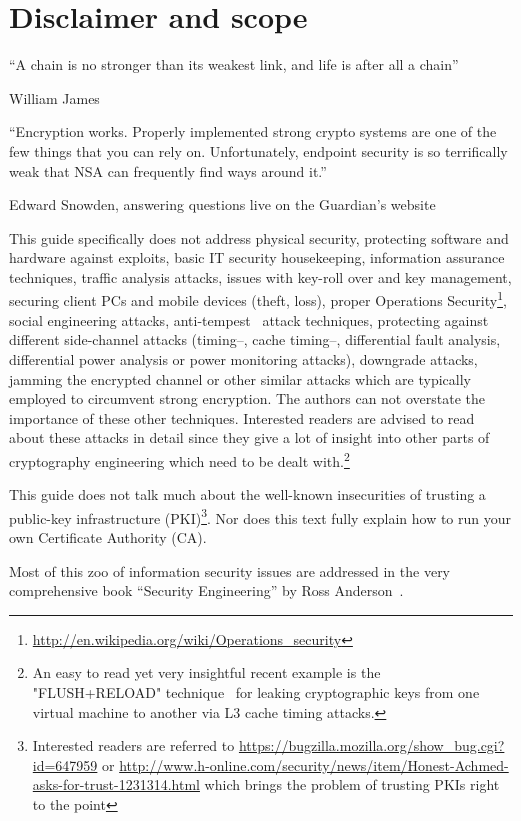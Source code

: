 \section{Disclaimer and scope}
\label{section:disclaimer}
\label{sec:disclaimer-scope}

\epigraph{``A chain is no stronger than its weakest link, and life is after all a chain''}{William James}
\epigraph{``Encryption works. Properly implemented strong crypto systems are
one of the few things that you can rely on. Unfortunately, endpoint security is
so terrifically weak that NSA can frequently find ways around it.''}{Edward
Snowden, answering questions live on the Guardian's
website~\cite{snowdenGuardianGreenwald}}


This guide specifically does not address physical security, protecting software
and hardware against exploits, basic IT security housekeeping, information
assurance techniques, traffic analysis attacks, issues with key-roll over and
key management, securing client PCs and mobile devices (theft, loss), proper
Operations Security\footnote{\url{http://en.wikipedia.org/wiki/Operations_security}}, social
engineering attacks, anti-tempest~\cite{Wikipedia:Tempest} attack techniques,
protecting against different side-channel attacks (timing--, cache timing--,
differential fault analysis, differential power analysis or power monitoring
attacks), downgrade attacks, jamming the encrypted channel or other similar
attacks which are typically employed to circumvent strong encryption.  The
authors can not overstate the importance of these other techniques.  Interested
readers are advised to read about these attacks in detail since they give a lot
of insight into other parts of cryptography engineering which need to be dealt
with.\footnote{An easy to read yet very insightful recent example is the
"FLUSH+RELOAD" technique~\cite{yarom2013flush+} for leaking cryptographic keys
from one virtual machine to another via L3 cache timing attacks.}

This guide does not talk much about the well-known insecurities of trusting a
public-key infrastructure (PKI)\footnote{Interested readers are referred to
\url{https://bugzilla.mozilla.org/show_bug.cgi?id=647959} or
\url{http://www.h-online.com/security/news/item/Honest-Achmed-asks-for-trust-1231314.html}
which brings the problem of trusting PKIs right to the point}. Nor
does this text fully explain how to run your own Certificate Authority (CA). 


Most of this zoo of information security issues are addressed in the very
comprehensive book ``Security Engineering'' by Ross Anderson~\cite{anderson2008security}. 

